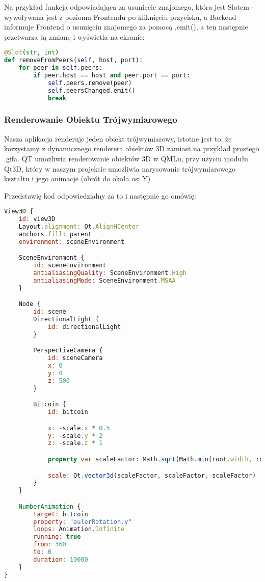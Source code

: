 Na przykład funkcja odpowiadająca za usunięcie znajomego, która jest Slotem - wywoływana jest z poziomu Frontendu po kliknięciu przycisku, a Backend informuje Frontend o usunięciu znajomego za pomocą .emit(), a ten następnie przetwarza tą zmianę i wyświetla na ekranie:
\begin{lstlisting}[language=Python, caption={Przykładowe użycie sygnału dla listy znajomych}]
@Slot(str, int)
def removeFromPeers(self, host, port):
    for peer in self.peers:
        if peer.host == host and peer.port == port:
            self.peers.remove(peer)
            self.peersChanged.emit()
            break
\end{lstlisting}

\subsubsection{Renderowanie Obiektu Trójwymiarowego}
\label{sec:RenderowanieObiektuTrójwymiarowego}
Nasza aplikacja renderuje jeden obiekt trójwymiarowy, istotne jest to, że korzystamy z dynamicznego renderera obiektów 3D zamiast na przykład prostego .gifa.
QT umożliwia renderowanie obiektów 3D w QMLu, przy użyciu modułu Qt3D, który w naszym projekcie umożliwia narysowanie trójwymiarowego kształtu i jego animacje (obrót do okoła osi Y)

Przedstawię kod odpowiedzialny za to i następnie go omówię:
\begin{lstlisting}[language=QML, caption={Renderowanie trójwymiarowego bitcoina}]
View3D {
    id: view3D
    Layout.alignment: Qt.AlignHCenter
    anchors.fill: parent
    environment: sceneEnvironment

    SceneEnvironment {
        id: sceneEnvironment
        antialiasingQuality: SceneEnvironment.High
        antialiasingMode: SceneEnvironment.MSAA
    }

    Node {
        id: scene
        DirectionalLight {
            id: directionalLight
        }

        PerspectiveCamera {
            id: sceneCamera
            x: 0
            y: 0
            z: 500
        }

        Bitcoin {
            id: bitcoin

            x: -scale.x * 0.5
            y: -scale.y * 2
            z: -scale.z * 1

            property var scaleFactor: Math.sqrt(Math.min(root.width, root.height)) * 5

            scale: Qt.vector3d(scaleFactor, scaleFactor, scaleFactor)
        }
    }

    NumberAnimation {
        target: bitcoin
        property: "eulerRotation.y"
        loops: Animation.Infinite
        running: true
        from: 360
        to: 0
        duration: 10000
    }
}
\end{lstlisting}

